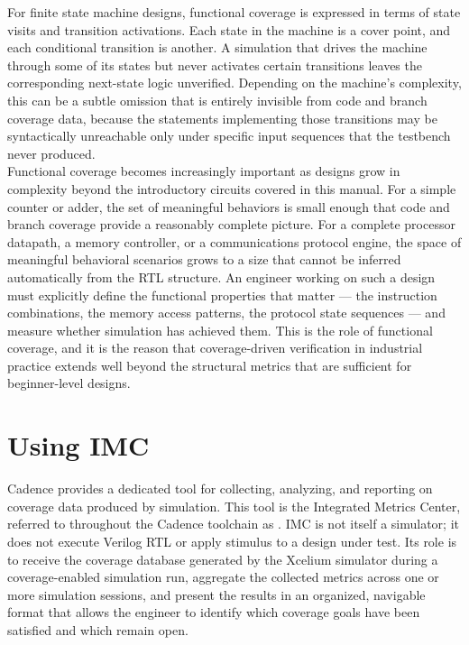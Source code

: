 For finite state machine designs, functional coverage is expressed in terms of state visits and transition activations. Each state in the machine is a cover point, and each conditional transition is another. A simulation that drives the machine through some of its states but never activates certain transitions leaves the corresponding next-state logic unverified. Depending on the machine's complexity, this can be a subtle omission that is entirely invisible from code and branch coverage data, because the statements implementing those transitions may be syntactically unreachable only under specific input sequences that the testbench never produced.\\

Functional coverage becomes increasingly important as designs grow in complexity beyond the introductory circuits covered in this manual. For a simple counter or adder, the set of meaningful behaviors is small enough that code and branch coverage provide a reasonably complete picture. For a complete processor datapath, a memory controller, or a communications protocol engine, the space of meaningful behavioral scenarios grows to a size that cannot be inferred automatically from the RTL structure. An engineer working on such a design must explicitly define the functional properties that matter — the instruction combinations, the memory access patterns, the protocol state sequences — and measure whether simulation has achieved them. This is the role of functional coverage, and it is the reason that coverage-driven verification in industrial practice extends well beyond the structural metrics that are sufficient for beginner-level designs.\\

\section{Using IMC}
\label{sec:using-imc}

Cadence provides a dedicated tool for collecting, analyzing, and reporting on coverage data produced by simulation. This tool is the Integrated Metrics Center, referred to throughout the Cadence toolchain as . IMC is not itself a simulator; it does not execute Verilog RTL or apply stimulus to a design under test. Its role is to receive the coverage database generated by the Xcelium simulator during a coverage-enabled simulation run, aggregate the collected metrics across one or more simulation sessions, and present the results in an organized, navigable format that allows the engineer to identify which coverage goals have been satisfied and which remain open.\\

